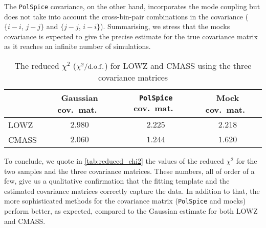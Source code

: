 \documentclass[astrosymb,twocolumn]{aastex631}
\begin{document}
The \texttt{PolSpice} covariance, on the other hand, incorporates the mode coupling but does not take into account the cross-bin-pair combinations in the covariance ($\{i-i$, $j-j\}$ and $\{j-j$, $i-i\}$). Summarising, we stress that the mocks covariance is expected to give the precise estimate for the true covariance matrix as it reaches an infinite number of simulations.


\begin{table}
\centering
\caption{The reduced \(\chi^2\) (\(\chi^2/{\rm d.o.f.}\)) for LOWZ and CMASS using the three covariance matrices}
\setlength{\tabcolsep}{2.3pt}
\renewcommand{\arraystretch}{0.9}
\begin{tabularx}{\columnwidth}{X c c c}
    \hline
   & Gaussian cov.\ mat.\ & \texttt{PolSpice} cov.\ mat.\ & Mock cov.\ mat.\ \\
    \hline
    \hline
    LOWZ & $2.980$ & $2.225$ & $2.218$ \\
    CMASS & $2.060$ & $1.244$ & $1.620$ \\
    \hline
\end{tabularx}
\label{tab:reduced_chi2}
\end{table}

To conclude, we quote in \autoref{tab:reduced_chi2} the values of the reduced \(\chi^2\) for the two samples and the three covariance matrices. These numbers, all of order of a few, give us a qualitative confirmation that the fitting template and the estimated covariance matrices correctly capture the data. In addition to that, the more sophisticated methods for the covariance matrix (\texttt{PolSpice} and mocks) perform better, as expected, compared to the Gaussian estimate for both LOWZ and CMASS.
\end{document}
